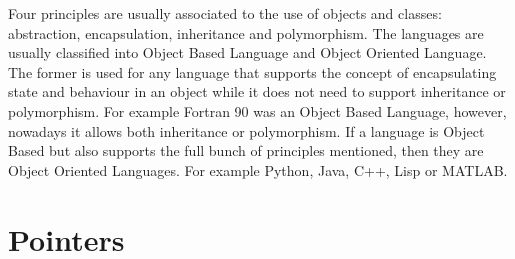 Four principles are usually associated to the use of objects and classes: 
abstraction, encapsulation, inheritance and polymorphism. 
The languages are usually classified into Object Based Language and Object Oriented Language.
The former is used for any language that supports the concept of encapsulating state and behaviour 
in an object while it does not need to support inheritance or polymorphism. 
For example Fortran 90 was an Object Based Language, however, nowadays it allows both inheritance or polymorphism.
If a language is Object Based but also supports the full bunch of principles mentioned, then they are Object Oriented Languages. 
For example Python, Java, C++, Lisp or MATLAB.








    \newpage 
    \section{Pointers} 


